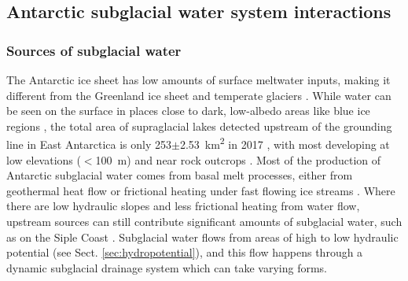 

\subsection{Antarctic subglacial water system interactions}

\subsubsection{Sources of subglacial water}

The Antarctic ice sheet has low amounts of surface meltwater inputs, making it different from the Greenland ice sheet and temperate glaciers \citep{BellAntarcticsurfacehydrology2018}.
While water can be seen on the surface in places close to dark, low-albedo areas like blue ice regions \citep[e.g.][]{KingslakeWidespreadmovementmeltwater2017}, the total area of supraglacial lakes detected upstream of the grounding line in East Antarctica is only 253$\pm$\SI{2.53}{\kilo\metre\squared} in 2017 \citep{StokesWidespreaddistributionsupraglacial2019}, with most developing at low elevations ($<$\SI{100}{\metre}) and near rock outcrops \citep{StokesWidespreaddistributionsupraglacial2019,DirscherlAutomatedMappingAntarctic2020}.
Most of the production of Antarctic subglacial water comes from basal melt processes, either from geothermal heat flow \citep[e.g.][]{FisherHighgeothermalheat2015,Burton-JohnsonReviewarticleGeothermal2020} or frictional heating under fast flowing ice streams \citep[e.g.][]{HoffmanFeedbackscoupledsubglacial2014,ZhaoBasalfrictionFleming2018}.
Where there are low hydraulic slopes and less frictional heating from water flow, upstream sources can still contribute significant amounts of subglacial water, such as on the Siple Coast \citep{AlleyWaterPressureCouplingSliding1989,BougamontNumericalinvestigationsslowdown2003}.
Subglacial water flows from areas of high to low hydraulic potential (see Sect. \ref{sec:hydropotential}), and this flow happens through a dynamic subglacial drainage system which can take varying forms.


